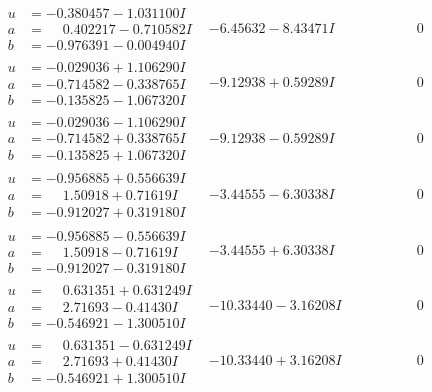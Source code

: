 \documentclass[1p]{elsarticle_modified}
\theoremstyle{definition}
\begin{document}
$$\begin{array}{c|c|c}
\begin{aligned}
u &= -0.380457 - 1.031100 I \\
a &= \phantom{-}0.402217 - 0.710582 I \\
b &= -0.976391 - 0.004940 I\end{aligned}
 & -6.45632 - 8.43471 I & \phantom{-0.000000 } 0 \\ \hline\begin{aligned}
u &= -0.029036 + 1.106290 I \\
a &= -0.714582 - 0.338765 I \\
b &= -0.135825 - 1.067320 I\end{aligned}
 & -9.12938 + 0.59289 I & \phantom{-0.000000 } 0 \\ \hline\begin{aligned}
u &= -0.029036 - 1.106290 I \\
a &= -0.714582 + 0.338765 I \\
b &= -0.135825 + 1.067320 I\end{aligned}
 & -9.12938 - 0.59289 I & \phantom{-0.000000 } 0 \\ \hline\begin{aligned}
u &= -0.956885 + 0.556639 I \\
a &= \phantom{-}1.50918 + 0.71619 I \\
b &= -0.912027 + 0.319180 I\end{aligned}
 & -3.44555 - 6.30338 I & \phantom{-0.000000 } 0 \\ \hline\begin{aligned}
u &= -0.956885 - 0.556639 I \\
a &= \phantom{-}1.50918 - 0.71619 I \\
b &= -0.912027 - 0.319180 I\end{aligned}
 & -3.44555 + 6.30338 I & \phantom{-0.000000 } 0 \\ \hline\begin{aligned}
u &= \phantom{-}0.631351 + 0.631249 I \\
a &= \phantom{-}2.71693 - 0.41430 I \\
b &= -0.546921 - 1.300510 I\end{aligned}
 & -10.33440 - 3.16208 I & \phantom{-0.000000 } 0 \\ \hline\begin{aligned}
u &= \phantom{-}0.631351 - 0.631249 I \\
a &= \phantom{-}2.71693 + 0.41430 I \\
b &= -0.546921 + 1.300510 I\end{aligned}
 & -10.33440 + 3.16208 I & \phantom{-0.000000 } 0 \\ \hline\begin{aligned}

\end{aligned}
\end{array}$$
\end{document}
